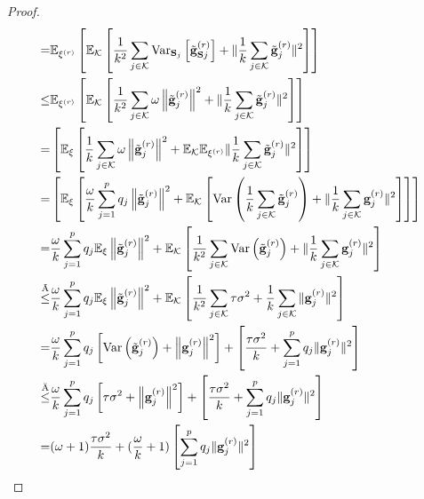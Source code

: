 \documentclass[twoside]{article}
\begin{document}
\begin{proof}
\begin{align}
\stackrel{}{=}& \mathbb{E}_{{\xi}^{(r)}}\left[\mathbb{E}_{\mathcal{K}}\left[\frac{1}{k^2}\sum_{j\in\mathcal{K}}\text{Var}_{\mathbf{S}_j}\left[\tilde{\mathbf{g}}_{\mathbf{S}j}^{(r)}\right]+\|\frac{1}{k}\sum_{j\in\mathcal{K}}\tilde{\mathbf{g}}_{j}^{(r)}\|^2\right]\right]\nonumber\\
\stackrel{}{\leq}& \mathbb{E}_{{\xi}^{(r)}}\left[\mathbb{E}_{\mathcal{K}}\left[\frac{1}{k^2}\sum_{j\in\mathcal{K}}\omega\left\|\tilde{\mathbf{g}}_{j}^{(r)}\right\|^2+\|\frac{1}{k}\sum_{j\in\mathcal{K}}\tilde{\mathbf{g}}_{j}^{(r)}\|^2\right]\right]\nonumber\\
\stackrel{}{=}& \left[\mathbb{E}_{\xi}\left[\frac{1}{k}\sum_{j\in\mathcal{K}}\omega\left\|\tilde{\mathbf{g}}_{j}^{(r)}\right\|^2+\mathbb{E}_{\mathcal{K}}\mathbb{E}_{{\xi}^{(r)}}\|\frac{1}{k}\sum_{j\in\mathcal{K}}\tilde{\mathbf{g}}_{j}^{(r)}\|^2\right]\right]\nonumber\\
\stackrel{}{=} &\left[\mathbb{E}_{\xi}\left[\frac{\omega}{k}\sum_{j=1}^pq_j\left\|\tilde{\mathbf{g}}_{j}^{(r)}\right\|^2+\mathbb{E}_{\mathcal{K}}\left[\text{Var}\left(\frac{1}{k}\sum_{j\in\mathcal{K}}\tilde{\mathbf{g}}_{j}^{(r)}\right)+\|\frac{1}{k}\sum_{j\in\mathcal{K}}{\mathbf{g}}_{j}^{(r)}\|^2\right]\right]\right]\nonumber\\
\stackrel{}{=}& \frac{\omega}{k}\sum_{j=1}^pq_j\mathbb{E}_{\xi}\left\|\tilde{\mathbf{g}}_{j}^{(r)}\right\|^2+\mathbb{E}_{\mathcal{K}}\left[\frac{1}{k^2}\sum_{j\in\mathcal{K}}\text{Var}\left(\tilde{\mathbf{g}}_{j}^{(r)}\right)+\|\frac{1}{k}\sum_{j\in\mathcal{K}}{\mathbf{g}}_{j}^{(r)}\|^2\right]\nonumber\\
\stackrel{\ding{195}}{\leq}&\frac{\omega}{k}\sum_{j=1}^pq_j\mathbb{E}_{\xi}\left\|\tilde{\mathbf{g}}_{j}^{(r)}\right\|^2+\mathbb{E}_{\mathcal{K}}\left[\frac{1}{k^2}\sum_{j\in\mathcal{K}}\tau\sigma^2+\frac{1}{k}\sum_{j\in\mathcal{K}}\|{\mathbf{g}}_{j}^{(r)}\|^2\right]\nonumber\\
=&\frac{\omega}{k}\sum_{j=1}^pq_j\left[\text{Var}\left(\tilde{\mathbf{g}}_{j}^{(r)}\right)+\left\|\mathbf{g}_{j}^{(r)}\right\|^2\right]+\left[\frac{\tau\sigma^2}{k}+\sum_{j=1}^pq_j\|{\mathbf{g}}_{j}^{(r)}\|^2\right]\nonumber\\
\stackrel{\ding{196}}{\leq}&\frac{\omega}{k}\sum_{j=1}^pq_j\left[\tau\sigma^2+\left\|\mathbf{g}_{j}^{(r)}\right\|^2\right]+\left[\frac{\tau\sigma^2}{k}+\sum_{j=1}^pq_j\|{\mathbf{g}}_{j}^{(r)}\|^2\right]\nonumber\\
=&(\omega+1)\frac{\tau\sigma^2}{k}+(\frac{\omega}{k}+1)\left[\sum_{j=1}^pq_j\|{\mathbf{g}}_{j}^{(r)}\|^2\right]\label{eq:lemma111}%

\end{align}
\end{proof}
\end{document}
